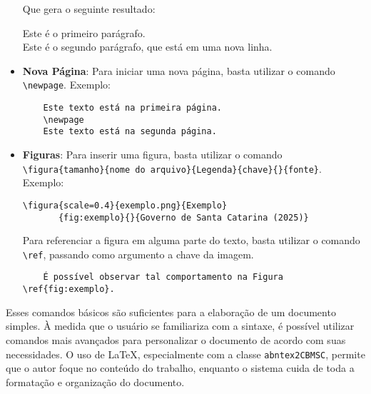 \begin{itemize}
    Que gera o seguinte resultado:

    Este é o primeiro parágrafo.\\
    Este é o segundo parágrafo, que está em uma nova linha.
    
    \item \textbf{Nova Página}: Para iniciar uma nova página, basta utilizar o comando \texttt{\textbackslash newpage}. Exemplo:
    \begin{verbatim}
    Este texto está na primeira página.
    \newpage
    Este texto está na segunda página.
    \end{verbatim}

    \item \textbf{Figuras}: Para inserir uma figura, basta utilizar o comando \texttt{\textbackslash figura\{tamanho\}\{nome do arquivo\}\{Legenda\}\{chave\}\{\}\{fonte\}}. Exemplo:
    \begin{verbatim}
\figura{scale=0.4}{exemplo.png}{Exemplo}
       {fig:exemplo}{}{Governo de Santa Catarina (2025)}
\end{verbatim}



    Para referenciar a figura em alguma parte do texto, basta utilizar o comando \texttt{\textbackslash ref}, passando como argumento a chave da imagem.

    \begin{verbatim}
    É possível observar tal comportamento na Figura \ref{fig:exemplo}.
    \end{verbatim}
\end{itemize}

Esses comandos básicos são suficientes para a elaboração de um documento simples. À medida que o usuário se familiariza com a sintaxe, é possível utilizar comandos mais avançados para personalizar o documento de acordo com suas necessidades. O uso de LaTeX, especialmente com a classe \texttt{abntex2CBMSC}, permite que o autor foque no conteúdo do trabalho, enquanto o sistema cuida de toda a formatação e organização do documento.


